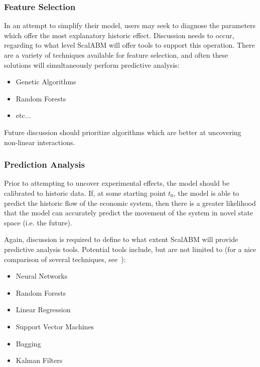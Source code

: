 \documentclass[a4paper]{article}
\begin{document}
\subsubsection{Feature Selection}

In an attempt to simplify their model, users may seek to diagnose the parameters which offer the most explanatory historic effect. Discussion needs to occur, regarding to what level ScalABM will offer tools to support this operation.
There are a variety of techniques available for feature selection, and often these solutions will simultaneously perform predictive analysis:

\begin{itemize}
    \item Genetic Algorithms
    \item Random Forests
    \item etc... 
\end{itemize}

Future discussion should prioritize algorithms which are better at uncovering non-linear interactions.

\subsubsection{Prediction Analysis}

Prior to attempting to uncover experimental effects, the model should be calibrated to historic data. If, at some starting point $t_0$, the model is able to predict the historic flow of the economic system, then there is a greater likelihood that the model can accurately predict the movement of the system in novel state space (i.e. the future). 

Again, discussion is required to define to what extent ScalABM will provide predictive analysis tools. Potential tools include, but are not limited to (for a nice comparison of several techniques, see~\citealp{Bajari2015machinelearning}):

\begin{itemize}
    \item Neural Networks
    \item Random Forests
    \item Linear Regression 
    \item Support Vector Machines
    \item Bagging
    \item Kalman Filters~\citep{Ward150703}
\end{itemize}
\end{document}
